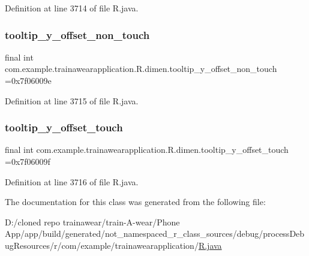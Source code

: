 Definition at line 3714 of file R.\+java.

\mbox{\label{classcom_1_1example_1_1trainawearapplication_1_1_r_1_1dimen_a593c19934fba3183d3b7fb48b85c89b8}} 
\subsubsection{\texorpdfstring{tooltip\_y\_offset\_non\_touch}{tooltip\_y\_offset\_non\_touch}}
{\footnotesize\ttfamily final int com.\+example.\+trainawearapplication.\+R.\+dimen.\+tooltip\+\_\+y\+\_\+offset\+\_\+non\+\_\+touch =0x7f06009e\hspace{0.3cm}{\ttfamily [static]}}



Definition at line 3715 of file R.\+java.

\mbox{\label{classcom_1_1example_1_1trainawearapplication_1_1_r_1_1dimen_ae9166e3eb67facc4394aae9b25003cb9}} 
\subsubsection{\texorpdfstring{tooltip\_y\_offset\_touch}{tooltip\_y\_offset\_touch}}
{\footnotesize\ttfamily final int com.\+example.\+trainawearapplication.\+R.\+dimen.\+tooltip\+\_\+y\+\_\+offset\+\_\+touch =0x7f06009f\hspace{0.3cm}{\ttfamily [static]}}



Definition at line 3716 of file R.\+java.



The documentation for this class was generated from the following file\+:\begin{DoxyCompactItemize}
\item 
D\+:/cloned repo trainawear/train-\/\+A-\/wear/\+Phone App/app/build/generated/not\+\_\+namespaced\+\_\+r\+\_\+class\+\_\+sources/debug/process\+Debug\+Resources/r/com/example/trainawearapplication/\mbox{\hyperlink{process_debug_resources_2r_2com_2example_2trainawearapplication_2_r_8java}{R.\+java}}\end{DoxyCompactItemize}
